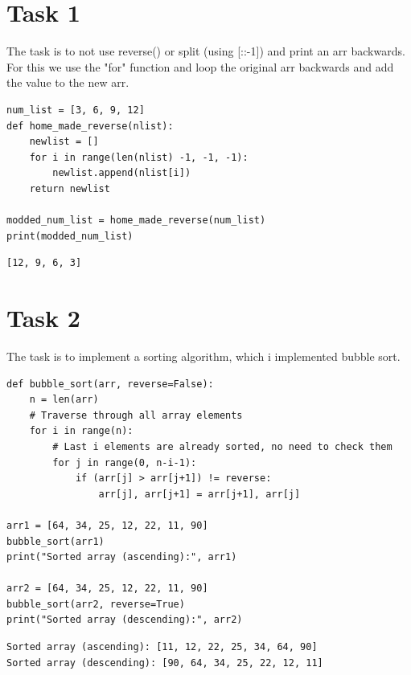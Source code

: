 \documentclass[11pt]{article}
\author{user}
\date{\today}
\title{}
\begin{document}
\tableofcontents

\section{Task 1}
\label{sec:org4ec4dce}
The task is to not use reverse() or split (using [::-1]) and
print an arr backwards. For this we use the "for" function and
loop the original arr backwards and add the value to the new arr.
\begin{verbatim}
num_list = [3, 6, 9, 12]
def home_made_reverse(nlist):
	newlist = []
	for i in range(len(nlist) -1, -1, -1):
		newlist.append(nlist[i])
	return newlist

modded_num_list = home_made_reverse(num_list)
print(modded_num_list)
\end{verbatim}

\label{orgc234817}
\begin{verbatim}
[12, 9, 6, 3]
\end{verbatim}
\section{Task 2}
\label{sec:org99a7742}
The task is to implement a sorting algorithm, which i implemented
bubble sort.
\begin{verbatim}
def bubble_sort(arr, reverse=False):
    n = len(arr)
    # Traverse through all array elements
    for i in range(n):
        # Last i elements are already sorted, no need to check them
        for j in range(0, n-i-1):
            if (arr[j] > arr[j+1]) != reverse:
                arr[j], arr[j+1] = arr[j+1], arr[j]

arr1 = [64, 34, 25, 12, 22, 11, 90]
bubble_sort(arr1)
print("Sorted array (ascending):", arr1)

arr2 = [64, 34, 25, 12, 22, 11, 90]
bubble_sort(arr2, reverse=True)
print("Sorted array (descending):", arr2)
\end{verbatim}

\label{org27ffc41}
\begin{verbatim}
Sorted array (ascending): [11, 12, 22, 25, 34, 64, 90]
Sorted array (descending): [90, 64, 34, 25, 22, 12, 11]
\end{verbatim}
\end{document}
